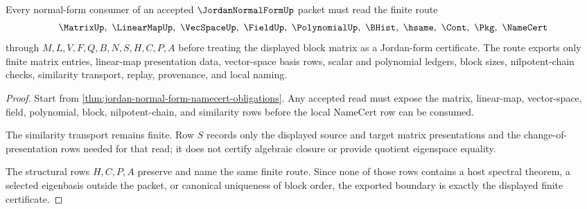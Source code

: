 \begin{theorem}
\label{thm:jordan-normal-form-similarity-boundary}
Every normal-form consumer of an accepted $\JordanNormalFormUp$ packet must read the finite route
$$
\MatrixUp,\ \LinearMapUp,\ \VecSpaceUp,\ \FieldUp,\ \PolynomialUp,\ \BHist,\ \hsame,\ \Cont,\ \Pkg,\ \NameCert
$$
through $M,L,V,F,Q,B,N,S,H,C,P,A$ before treating the displayed block matrix as a Jordan-form certificate. The route exports only finite matrix entries, linear-map presentation data, vector-space basis rows, scalar and polynomial ledgers, block sizes, nilpotent-chain checks, similarity transport, replay, provenance, and local naming.
\end{theorem}
\begin{proof}
Start from \autoref{thm:jordan-normal-form-namecert-obligations}. Any accepted read must expose the matrix, linear-map, vector-space, field, polynomial, block, nilpotent-chain, and similarity rows before the local NameCert row can be consumed.

The similarity transport remains finite. Row $S$ records only the displayed source and target matrix presentations and the change-of-presentation rows needed for that read; it does not certify algebraic closure or provide quotient eigenspace equality.

The structural rows $H,C,P,A$ preserve and name the same finite route. Since none of those rows contains a host spectral theorem, a selected eigenbasis outside the packet, or canonical uniqueness of block order, the exported boundary is exactly the displayed finite certificate.
\end{proof}




